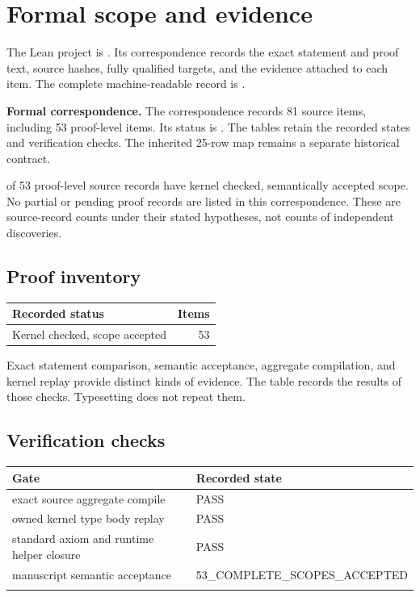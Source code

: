 \section{Formal scope and evidence}\label{sec:current-release}

The Lean project is . Its correspondence records the exact statement and proof text, source hashes, fully qualified targets, and the evidence attached to each item. The complete machine-readable record is .

\textbf{Formal correspondence.} The correspondence records 81 source items, including 53 proof-level items. Its status is . The tables retain the recorded states and verification checks. The inherited 25-row map remains a separate historical contract.
\par{} of 53 proof-level source records have kernel checked, semantically accepted scope. No partial or pending proof records are listed in this correspondence. These are source-record counts under their stated hypotheses, not counts of independent discoveries.


\subsection{Proof inventory}

\begin{tabular}{p{}r}\toprule Recorded status & Items \\ \midrule

Kernel checked, scope accepted & 53 \\

\bottomrule\end{tabular}

Exact statement comparison, semantic acceptance, aggregate compilation, and kernel replay provide distinct kinds of evidence. The table records the results of those checks. Typesetting does not repeat them.

\subsection{Verification checks}

\begin{longtable}{p{}p{}}\toprule Gate & Recorded state \\ \midrule\endhead

exact source aggregate compile & PASS \\ \addlinespace

owned kernel type body replay & PASS \\ \addlinespace

standard axiom and runtime helper closure & PASS \\ \addlinespace

manuscript semantic acceptance & 53\_COMPLETE\_SCOPES\_ACCEPTED \\ \addlinespace

\bottomrule\end{longtable}

